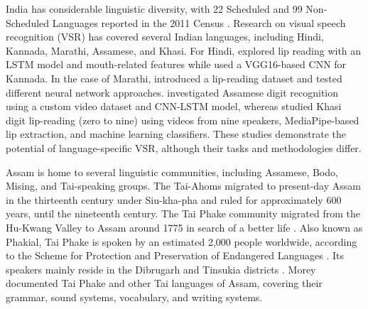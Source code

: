 \documentclass[journal]{IEEEtran}
\begin{document}
India has considerable linguistic diversity, with 22 Scheduled and 99 Non-Scheduled Languages reported in the 2011 Census \cite{census2011language}. Research on visual speech recognition (VSR) has covered several Indian languages, including Hindi, Kannada, Marathi, Assamese, and Khasi. For Hindi, \cite{patil2019hindi} explored lip reading with an LSTM model and mouth-related features while \cite{rudregowda2023kannada} used a VGG16-based CNN for Kannada. In the case of Marathi, \cite{kulkarni2024marathi} introduced a lip-reading dataset and tested different neural network approaches. \cite{prasad2025analysis} investigated Assamese digit recognition using a custom video dataset and CNN-LSTM model, whereas \cite{lyngdoh2026khasi} studied Khasi digit lip-reading (zero to nine) using videos from nine speakers, MediaPipe-based lip extraction, and machine learning classifiers. These studies demonstrate the potential of language-specific VSR, although their tasks and methodologies differ.

Assam is home to several linguistic communities, including Assamese, Bodo, Mising, and Tai-speaking groups. The Tai-Ahoms migrated to present-day Assam in the thirteenth century under Siu-kha-pha and ruled for approximately 600 years, until the nineteenth century. The Tai Phake community migrated from the Hu-Kwang Valley to Assam around 1775 in search of a better life \cite{lahkar2019origin}. Also known as Phakial, Tai Phake is spoken by an estimated 2,000 people worldwide, according to the Scheme for Protection and Preservation of Endangered Languages \cite{deka2025studying}. Its speakers mainly reside in the Dibrugarh and Tinsukia districts \cite{sppeletaiphake}. Morey  documented Tai Phake and other Tai languages of Assam, covering their grammar, sound systems, vocabulary, and writing systems\cite{morey2005tailanguages}.
\end{document}
